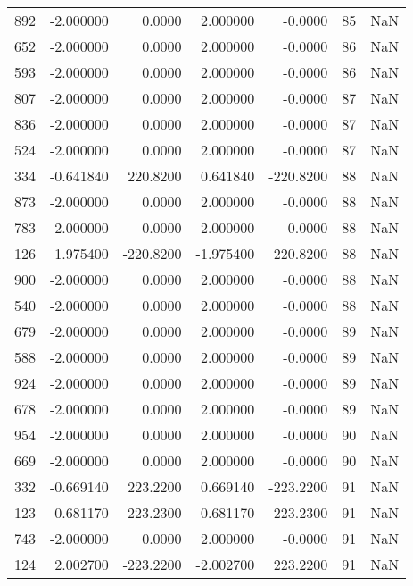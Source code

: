 \begin{tabular}{rrrrrrr}
 892 &   -2.000000 &    0.0000 &    2.000000 &     -0.0000 &          85 & NaN \\
 652 &   -2.000000 &    0.0000 &    2.000000 &     -0.0000 &          86 & NaN \\
 593 &   -2.000000 &    0.0000 &    2.000000 &     -0.0000 &          86 & NaN \\
 807 &   -2.000000 &    0.0000 &    2.000000 &     -0.0000 &          87 & NaN \\
 836 &   -2.000000 &    0.0000 &    2.000000 &     -0.0000 &          87 & NaN \\
 524 &   -2.000000 &    0.0000 &    2.000000 &     -0.0000 &          87 & NaN \\
 334 &   -0.641840 &  220.8200 &    0.641840 &   -220.8200 &          88 & NaN \\
 873 &   -2.000000 &    0.0000 &    2.000000 &     -0.0000 &          88 & NaN \\
 783 &   -2.000000 &    0.0000 &    2.000000 &     -0.0000 &          88 & NaN \\
 126 &    1.975400 & -220.8200 &   -1.975400 &    220.8200 &          88 & NaN \\
 900 &   -2.000000 &    0.0000 &    2.000000 &     -0.0000 &          88 & NaN \\
 540 &   -2.000000 &    0.0000 &    2.000000 &     -0.0000 &          88 & NaN \\
 679 &   -2.000000 &    0.0000 &    2.000000 &     -0.0000 &          89 & NaN \\
 588 &   -2.000000 &    0.0000 &    2.000000 &     -0.0000 &          89 & NaN \\
 924 &   -2.000000 &    0.0000 &    2.000000 &     -0.0000 &          89 & NaN \\
 678 &   -2.000000 &    0.0000 &    2.000000 &     -0.0000 &          89 & NaN \\
 954 &   -2.000000 &    0.0000 &    2.000000 &     -0.0000 &          90 & NaN \\
 669 &   -2.000000 &    0.0000 &    2.000000 &     -0.0000 &          90 & NaN \\
 332 &   -0.669140 &  223.2200 &    0.669140 &   -223.2200 &          91 & NaN \\
 123 &   -0.681170 & -223.2300 &    0.681170 &    223.2300 &          91 & NaN \\
 743 &   -2.000000 &    0.0000 &    2.000000 &     -0.0000 &          91 & NaN \\
 124 &    2.002700 & -223.2200 &   -2.002700 &    223.2200 &          91 & NaN \\

\end{tabular}
